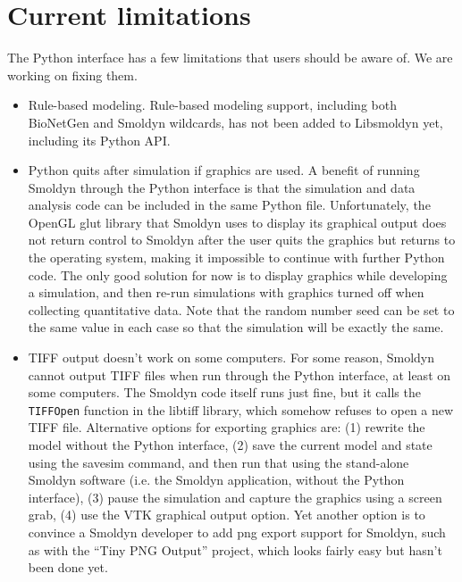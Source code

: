 \documentclass {scrbook}
\newcommand {\ttt} {\texttt}
\begin{document}
\section{Current limitations}

The Python interface has a few limitations that users should be aware of. We are working on fixing them.

\begin{itemize}

\item{Rule-based modeling}. Rule-based modeling support, including both BioNetGen and Smoldyn wildcards, has not been added to Libsmoldyn yet, including its Python API.

\item{Python quits after simulation if graphics are used}. A benefit of running Smoldyn through the Python interface is that the simulation and data analysis code can be included in the same Python file. Unfortunately, the OpenGL glut library that Smoldyn uses to display its graphical output does not return control to Smoldyn after the user quits the graphics but returns to the operating system, making it impossible to continue with further Python code. The only good solution for now is to display graphics while developing a simulation, and then re-run simulations with graphics turned off when collecting quantitative data. Note that the random number seed can be set to the same value in each case so that the simulation will be exactly the same.

\item{TIFF output doesn't work on some computers.} For some reason, Smoldyn cannot output TIFF files when run through the Python interface, at least on some computers. The Smoldyn code itself runs just fine, but it calls the \ttt{TIFFOpen} function in the libtiff library, which somehow refuses to open a new TIFF file. Alternative options for exporting graphics are: (1) rewrite the model without the Python interface, (2) save the current model and state using the savesim command, and then run that using the stand-alone Smoldyn software (i.e. the Smoldyn application, without the Python interface), (3) pause the simulation and capture the graphics using a screen grab, (4) use the VTK graphical output option. Yet another option is to convince a Smoldyn developer to add png export support for Smoldyn, such as with the ``Tiny PNG Output'' project, which looks fairly easy but hasn't been done yet.

\end{itemize}
\end{document}
